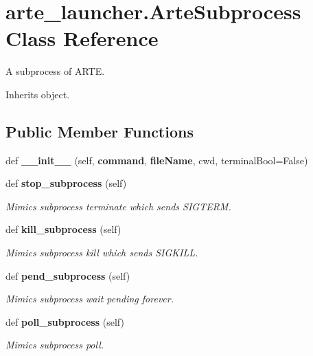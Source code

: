\section{arte\+\_\+launcher.\+Arte\+Subprocess Class Reference}
\label{classarte__launcher_1_1_arte_subprocess}


A subprocess of A\+R\+TE.  




Inherits object.

\subsection*{Public Member Functions}
\begin{DoxyCompactItemize}
\item 
def {\bfseries \+\_\+\+\_\+init\+\_\+\+\_\+} (self, {\bf command}, {\bf file\+Name}, cwd, terminal\+Bool=False)\label{classarte__launcher_1_1_arte_subprocess_a924f9ab8a4ede522aa7cc20b3fc8d9bb}

\item 
def {\bf stop\+\_\+subprocess} (self)
\begin{DoxyCompactList}\small\item\em Mimics subprocess terminate which sends S\+I\+G\+T\+E\+RM. \end{DoxyCompactList}\item 
def {\bf kill\+\_\+subprocess} (self)
\begin{DoxyCompactList}\small\item\em Mimics subprocess kill which sends S\+I\+G\+K\+I\+LL. \end{DoxyCompactList}\item 
def {\bf pend\+\_\+subprocess} (self)
\begin{DoxyCompactList}\small\item\em Mimics subprocess wait pending forever. \end{DoxyCompactList}\item 
def {\bf poll\+\_\+subprocess} (self)
\begin{DoxyCompactList}\small\item\em Mimics subprocess poll. \end{DoxyCompactList}\end{DoxyCompactItemize}
